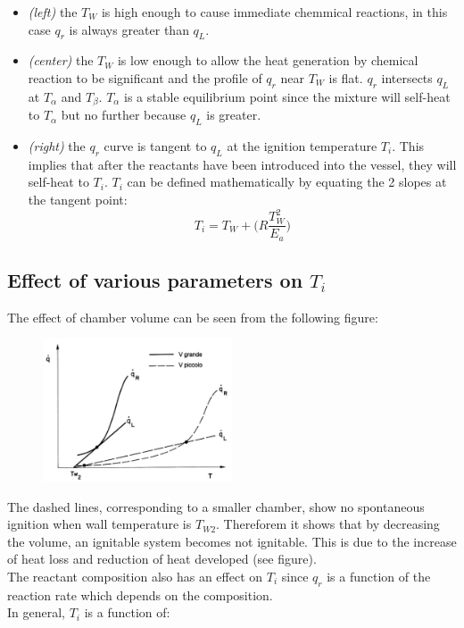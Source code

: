 \documentclass[12pt]{article}
\begin{document}
\begin{itemize}
    \item \textit{(left)} the $T_{W}$ is high enough to cause immediate chemmical reactions, in this case $q_{r}$ is always greater than $q_{L}$.
    \item \textit{(center)} the $T_{W}$ is low enough to allow the heat generation by chemical reaction to be significant and the profile of $q_{r}$ near $T_{W}$ is flat. $q_{r}$ intersects $q_{L}$ at $T_{\alpha}$ and $T_{\beta}$. $T_{\alpha}$ is a stable equilibrium point since the mixture will self-heat to $T_{\alpha}$ but no further because $q_{L}$ is greater.
    \item \textit{(right)} the $q_{r}$ curve is tangent to $q_{L}$ at the ignition temperature $T_{i}$. This implies that after the reactants have been introduced into the vessel, they will self-heat to $T_{i}$. $T_{i}$ can be defined mathematically by equating the 2 slopes at the tangent point:
    \begin{equation}
        T_{i}=T_{W}+\bigg(R\frac{T_{W}^{2}}{E_{a}}\bigg)
    \end{equation}
\end{itemize}

\subsection{Effect of various parameters on $T_{i}$}

The effect of chamber volume can be seen from the following figure:

\begin{figure}[!ht]
\centering
\includegraphics[width=0.5\textwidth]{figures/dashed.png}
\end{figure}

The dashed lines, corresponding to a smaller chamber, show no spontaneous ignition when wall temperature is $T_{W2}$. Thereforem it shows that by decreasing the volume, an ignitable system becomes not ignitable. This is due to the increase of heat loss and reduction of heat developed (see figure).\\
The reactant composition also has an effect on $T_{i}$ since $q_{r}$ is a function of the reaction rate which depends on the composition.\\
In general, $T_{i}$ is a function of:
\end{document}
